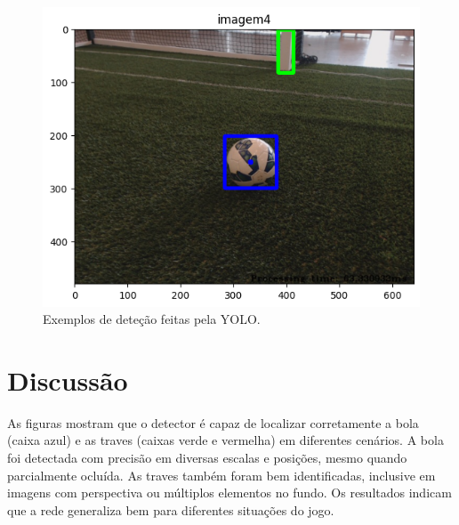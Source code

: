 \documentclass[a4paper,12pt]{article}
\begin{document}
\begin{figure}[htbp]
\begin{minipage}[b]{0.45\textwidth}
    \end{minipage}
    \hfill
    \begin{minipage}[b]{0.45\textwidth}
        \centering
        \includegraphics[width=\textwidth]{imagem5.png}
   
    \end{minipage}
    \caption{Exemplos de deteção feitas pela YOLO.}
\end{figure}

\section{Discussão}

As figuras mostram que o detector é capaz de localizar corretamente a bola (caixa azul) e as traves (caixas verde e vermelha) em diferentes cenários. A bola foi detectada com precisão em diversas escalas e posições, mesmo quando parcialmente ocluída. As traves também foram bem identificadas, inclusive em imagens com perspectiva ou múltiplos elementos no fundo. Os resultados indicam que a rede generaliza bem para diferentes situações do jogo.
\end{document}

